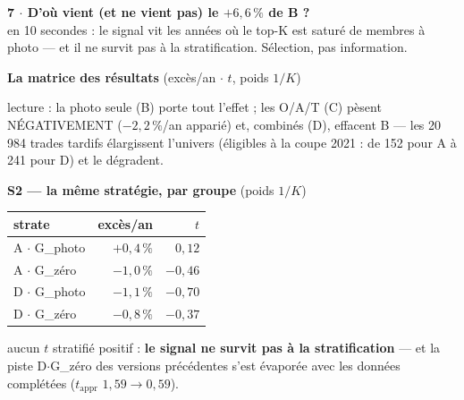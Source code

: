 \documentclass[10pt,a4paper,landscape]{article}
\begin{document}
\newpage
\begin{center}
{\Large\bfseries 7 $\cdot$ D'où vient (et ne vient pas) le $+6{,}6\,\%$ de B ?}\\[0.5mm]
{\scriptsize en 10 secondes : le signal vit les années où le top-K est saturé de membres à photo --- et il ne survit pas à la stratification. Sélection, pas information.}
\end{center}

\noindent\begin{minipage}[t]{0.46\textwidth}\vspace{0pt}
\textbf{La matrice des résultats} {\scriptsize(excès/an $\cdot$ $t$, poids $1/K$)}
\begin{center}
\end{center}
{\scriptsize lecture : la photo seule (B) porte tout l'effet ; les O/A/T (C) pèsent NÉGATIVEMENT ($-2{,}2\,\%$/an apparié) et, combinés (D), effacent B --- les 20\,984 trades tardifs élargissent l'univers (éligibles à la coupe 2021 : de 152 pour A à 241 pour D) et le dégradent.}

\vspace{2mm}
\textbf{S2 --- la même stratégie, par groupe} {\scriptsize(poids $1/K$)}
\begin{center}\small
\begin{tabular}{@{}lrr@{}}
\toprule
strate & excès/an & $t$ \\
\midrule
A $\cdot$ G\_photo & $+0{,}4\,\%$ & $0{,}12$ \\
A $\cdot$ G\_zéro & $-1{,}0\,\%$ & $-0{,}46$ \\
D $\cdot$ G\_photo & $-1{,}1\,\%$ & $-0{,}70$ \\
D $\cdot$ G\_zéro & $-0{,}8\,\%$ & $-0{,}37$ \\
\bottomrule
\end{tabular}
\end{center}
{\scriptsize aucun $t$ stratifié positif : \textbf{le signal ne survit pas à la stratification} --- et la piste \og D$\cdot$G\_zéro \fg{} des versions précédentes s'est évaporée avec les données complétées ($t_{\text{appr}}$ $1{,}59 \to 0{,}59$).}


\end{minipage}
\end{document}
